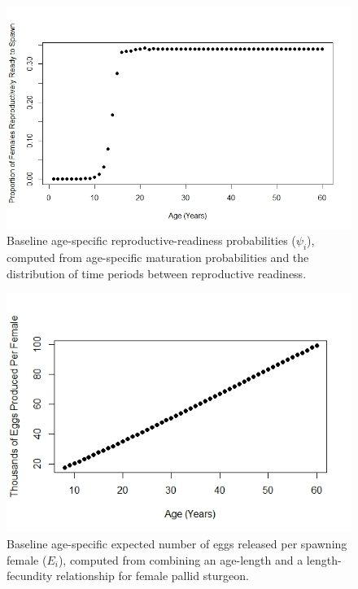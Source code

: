 \documentclass[12pt]{article}
\begin{document}
\begin{figure}[h]
\centering
\includegraphics[width=6in]{NEPA_fig_5-psi}
\caption{Baseline age-specific reproductive-readiness probabilities ($\psi_i$), computed from age-specific maturation probabilities and the distribution of time periods between reproductive readiness.}
\end{figure}



\begin{figure}[h]
\centering
\includegraphics[width=6in]{NEPA_fig_6-eggs}
\caption{Baseline age-specific expected number of eggs released per spawning female ($E_i$), computed from combining an age-length and a length-fecundity relationship for female pallid sturgeon.}
\end{figure}
\end{document}
